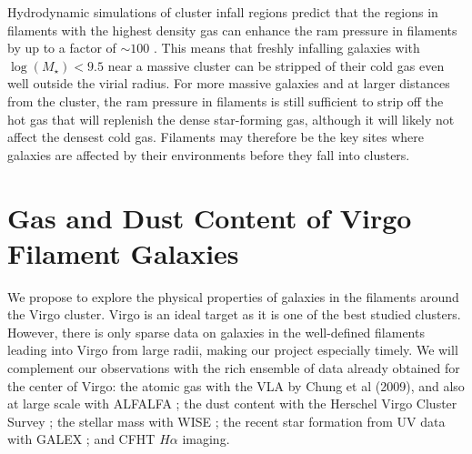 \documentclass[11pt, preprint]{aastex}
\begin{document}
Hydrodynamic simulations of cluster infall regions predict that
the regions in filaments with the highest density gas can enhance the ram pressure in
filaments by up to a factor of $\sim 100$ \citep{bahe13}.  This 
means that freshly infalling galaxies with $\log(M_\star)<9.5$ near a massive
cluster can be stripped of their cold gas even well outside the virial
radius.  For more massive galaxies and at larger distances from the
cluster, the ram pressure in filaments is still sufficient to strip
off the hot gas that will replenish the dense star-forming gas,
although it will likely not affect the densest cold gas.  
Filaments may therefore be the key
sites where galaxies are affected by their environments before they fall into
clusters. 

\vspace*{-.8cm}
\section{Gas and Dust Content of Virgo Filament Galaxies}
\vspace*{-.4cm}
We propose to explore the physical properties of
galaxies in the filaments around the Virgo cluster.   
Virgo is an ideal
target as it is one of the best studied clusters.  However, there is
only sparse data on galaxies in the well-defined filaments leading
into Virgo from large radii, making our project especially timely.  We will complement our observations with the rich
ensemble of data already obtained for the center of Virgo: the atomic
gas with the VLA by Chung
et al (2009), and also at large scale with ALFALFA \citep{giovanelli05}; the
dust content with the Herschel Virgo Cluster Survey \citep{davies10};
the stellar mass with WISE \citep{ferrarese12}; the recent star formation
from UV data with GALEX \citep{boselli11}; and CFHT $H\alpha$ imaging.



\end{document}
